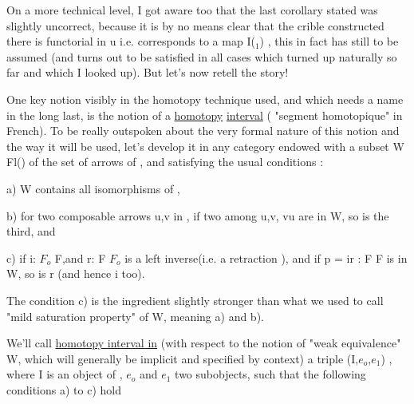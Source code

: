 
On a more technical level,  I got aware too that the last corollary
 stated was slightly uncorrect,  because it is by no means clear that the
crible  constructed there is  functorial in u  i.e. corresponds to a map
I\hand{$\to\alpha$}(\hand{$\Delta$}$_1$) ,  this in fact has still to be assumed  (and turns out to be
 satisfied in all cases which turned up naturally so far and which
I looked up).  But let's now retell the story!

One key notion visibly in the homotopy technique used,  and which
needs a name in the long last,  is the notion of a \uline{homotopy} \uline{interval}\xout{\unsure{,}}
( "segment homotopique" in French).  To be really outspoken about the very
formal nature of this notion and the way it will be used,  let's develop
it in any category  endowed with a subset  W \hand{$\subset$} Fl() of the set of
arrows of  , and satisfying the usual conditions :

a)  W contains all isomorphisms of  ,

b)  for two composable arrows u,v in ,  if  two among u,v, vu are
in W,  so is the third,  and

c)  if  i: $F_o$ \hand{$\to$} F,and r: F \hand{$\to$} $F_o$ is a left inverse(i.e. a retraction ),
and if  p = ir : F \hand{$\to$} F is in W,  so is r (and hence i too).

The condition c)  is the ingredient slightly stronger than what we used
to call "mild saturation property" of W,  meaning a) and b).

We'll call \uline{homotopy interval in}  (with respect to the notion of
"weak equivalence" W,  which will generally be implicit and specified by
context)  a triple (I,$e_o$,$e_1$) ,  where I is an object of  , $e_o$ and $e_1$
 two subobjects,  such that the following conditions a) to c) hold 

